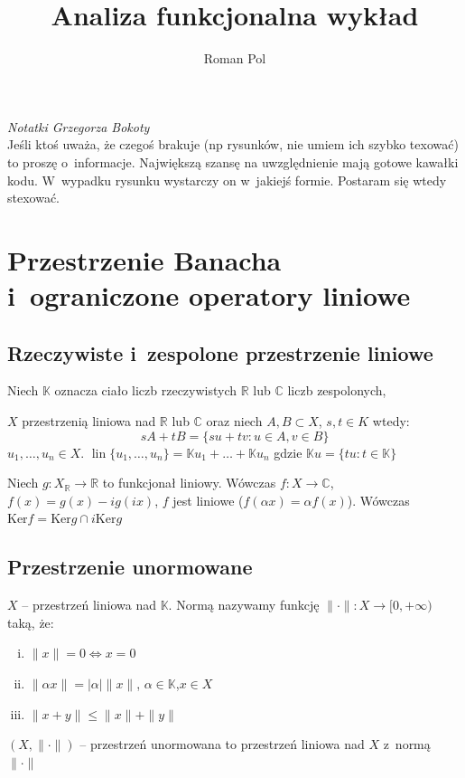 \documentclass[10pt]{article}
\title{Analiza funkcjonalna wykład}
\author{Roman Pol}
\renewcommand{\[}{\begin{equation}}
\renewcommand{\]}{\end{equation}}
\newcommand{\C}{{\ensuremath{\mathbb C}}}
\newcommand{\R}{{\ensuremath{\mathbb R}}}
\newcommand{\K}{\ensuremath{\mathbb{K}}}
\newcommand{\lin}{\operatorname{lin}}
\newcounter{numer}
\begin{document}
\setlength{\headheight}{15pt}
\pagestyle{fancy}
\maketitle
\emph{Notatki Grzegorza Bokoty}\\
Jeśli ktoś uważa, że czegoś brakuje (np rysunków, nie umiem ich szybko texować) to proszę o~informacje. 
Największą szansę na uwzględnienie mają gotowe kawałki kodu. W~wypadku rysunku wystarczy on w~jakiejś formie. Postaram się wtedy stexować.
\tableofcontents
{}
\newpage
\section{Przestrzenie Banacha i~ograniczone operatory liniowe}
\subsection{Rzeczywiste i~zespolone przestrzenie liniowe}
Niech $\K$ oznacza ciało liczb rzeczywistych $\R$ lub $\C$ liczb zespolonych,\par
$X$ przestrzenią liniowa nad $\R$ lub $\C$ oraz niech $A,B \subset  X$, $s,t \in K$ wtedy:
$$sA+tB = \{su + tv: u \in A, v\in B\}$$
$u_1,\ldots ,u_n \in X $. $\lin\{u_1,\ldots, u_n\} = \K u_1 + \ldots + \K u_n $ gdzie $\K u = \{ t u: t \in \K\} $ 

Niech $g: X_\R \to \R $ to funkcjonał liniowy. Wówczas $f: X \to \C$, $f(x) =g(x) - ig(ix)$, $f$ jest liniowe ($f(\alpha x) = \alpha f(x)$). 
Wówczas $\textrm{Ker}f = \textrm{Ker} g \cap i \textrm{Ker}g$

\subsection{Przestrzenie unormowane}
$X$ -- przestrzeń liniowa nad $\K$. Normą nazywamy funkcję  $\|\cdot \| : X \to [0, +\infty )$ taką, że:
	\begin{enumerate}[i.]
	\item $\|x\| = 0 \Leftrightarrow x=0$ 
	\item $\|\alpha x \| = |\alpha| \| x\|$, $\alpha \in \K$,$x\in X$ 
	\item $\|x+y\| \le \|x\| + \|y\|$  
\end{enumerate}
$(X,\|\cdot\|)$ -- przestrzeń unormowana to przestrzeń liniowa nad $X$ z~normą $\|\cdot\|$\\
\end{document}
